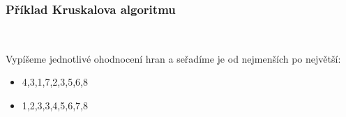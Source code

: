 \documentclass[hidelinks, 10pt, pdf, hyperref={unicode}]{beamer}
\begin{document}
    \begin{frame}[t]
        \frametitle{Příklad Kruskalova algoritmu}
        \begin{center}
            \\
        \end{center}
        Vypíšeme jednotlivé ohodnocení hran a seřadíme je od nejmenších po největší:
        \begin{itemize}
            \item{4,3,1,7,2,3,5,6,8}
            \item{1,2,3,3,4,5,6,7,8}
        \end{itemize}

    \end{frame}
    
\end{document}
